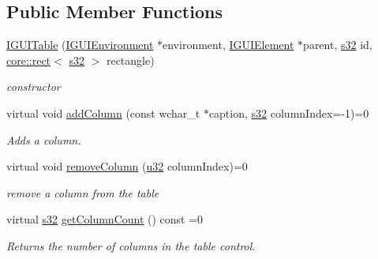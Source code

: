 \subsection*{Public Member Functions}
\begin{DoxyCompactItemize}
\item 
\mbox{\label{classirr_1_1gui_1_1IGUITable_a5900df485398a4184ed8d8dbbd077f7e}} 
\hyperlink{classirr_1_1gui_1_1IGUITable_a5900df485398a4184ed8d8dbbd077f7e}{I\+G\+U\+I\+Table} (\hyperlink{classirr_1_1gui_1_1IGUIEnvironment}{I\+G\+U\+I\+Environment} $\ast$environment, \hyperlink{classirr_1_1gui_1_1IGUIElement}{I\+G\+U\+I\+Element} $\ast$parent, \hyperlink{namespaceirr_ac66849b7a6ed16e30ebede579f9b47c6}{s32} id, \hyperlink{classirr_1_1core_1_1rect}{core\+::rect}$<$ \hyperlink{namespaceirr_ac66849b7a6ed16e30ebede579f9b47c6}{s32} $>$ rectangle)
\begin{DoxyCompactList}\small\item\em constructor \end{DoxyCompactList}\item 
virtual void \hyperlink{classirr_1_1gui_1_1IGUITable_a6ae4360ca563f13a178e69653187e7f6}{add\+Column} (const wchar\+\_\+t $\ast$caption, \hyperlink{namespaceirr_ac66849b7a6ed16e30ebede579f9b47c6}{s32} column\+Index=-\/1)=0
\begin{DoxyCompactList}\small\item\em Adds a column. \end{DoxyCompactList}\item 
\mbox{\label{classirr_1_1gui_1_1IGUITable_a3b86aae404cf9afbbba0fe72dfc56ca4}} 
virtual void \hyperlink{classirr_1_1gui_1_1IGUITable_a3b86aae404cf9afbbba0fe72dfc56ca4}{remove\+Column} (\hyperlink{namespaceirr_a0416a53257075833e7002efd0a18e804}{u32} column\+Index)=0
\begin{DoxyCompactList}\small\item\em remove a column from the table \end{DoxyCompactList}\item 
\mbox{\label{classirr_1_1gui_1_1IGUITable_ac8511fdab2f1d286778eb4dbf3aff22e}} 
virtual \hyperlink{namespaceirr_ac66849b7a6ed16e30ebede579f9b47c6}{s32} \hyperlink{classirr_1_1gui_1_1IGUITable_ac8511fdab2f1d286778eb4dbf3aff22e}{get\+Column\+Count} () const =0
\begin{DoxyCompactList}\small\item\em Returns the number of columns in the table control. \end{DoxyCompactList}\item 

\end{DoxyCompactItemize}
